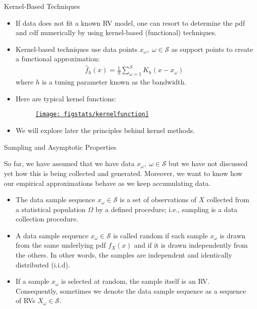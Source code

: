 \documentclass[9pt]{beamer}
\begin{document}
%
\begin{frame}{Kernel-Based Techniques}

\begin{itemize}
\item If data does not fit a known RV model, one can resort to determine the pdf and cdf numerically by using kernel-based (functional) techniques. 

\item Kernel-based techniques use data points $x_\omega,\; \omega \in \mathcal{S}$ as support points to create a functional  approximation:
\begin{align*}
\hat{f}_h(x) = \frac{1}{S}\sum_{\omega=1}^S K_h (x - x_\omega) 
\end{align*}
where $h$ is a tuning parameter known as the bandwidth. 
\item Here are typical kernel functions:
\begin{figure}[!htb]
    \centering
	\href{https://en.wikipedia.org/wiki/Kernel_(statistics)}{\texttt{[image: figstats/kernelfunction]}}
\end{figure}
\item We will explore later the principles behind kernel methods. 

\end{itemize}


\end{frame}



%
\begin{frame}{Sampling and Asymptotic Properties}

So far, we have assumed that we have data $x_\omega,\; \omega \in \mathcal{S}$ but we have not discussed yet how this is being collected and generated.  Moreover, we want to know how our empirical approximations behave as we keep accumulating data.  

\begin{itemize}
\item The data sample sequence $x_\omega \in \mathcal{S}$ is a set of observations of $X$ collected from a statistical population $\Omega$ by a defined procedure; i.e., sampling is a data collection procedure. 

\item A data sample sequence $x_\omega \in \mathcal{S}$ is called random if each sample $x_\omega$ is drawn from the same underlying pdf $f_X(x)$ and if it is drawn independently from the others. In other words, the samples are independent and identically distributed (i.i.d).

\item If a sample $x_\omega$ is selected at random, the sample itself is an RV. Consequently, sometimes we denote the data sample sequence as a sequence of RVs $X_\omega \in \mathcal{S}$.  

\end{itemize}

\end{frame}
\end{document}
